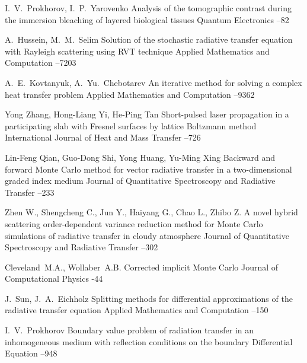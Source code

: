 \documentclass[12pt,reqno]{report}
\begin{document}
{\begin{thebibliography}{1}
\by I.~V.~Prokhorov, I.~P.~Yarovenko
\paper Analysis of the tomographic contrast during the immersion bleaching of layered biological tissues
\jour Quantum Electronics
--82

\by
A.~Hussein, M.~M.~Selim
\paper Solution of the stochastic radiative transfer equation with Rayleigh scattering using RVT technique \jour 
Applied Mathematics and Computation     --7203


\by A.~E.~Kovtanyuk, A.~Yu.~Chebotarev
\paper An iterative method for solving a complex heat transfer problem
\jour Applied Mathematics and Computation    --9362


 \by Yong Zhang, Hong-Liang Yi, He-Ping Tan  \paper Short-pulsed laser propagation in a participating slab with Fresnel
surfaces by lattice Boltzmann method \jour International Journal of Heat and Mass Transfer   --726


 \by Lin-Feng Qian, Guo-Dong Shi, Yong Huang, Yu-Ming Xing \paper Backward and forward Monte Carlo method for vector radiative transfer in a two-dimensional graded index medium \jour Journal of Quantitative Spectroscopy and Radiative Transfer   --233

 \by Zhen W., Shengcheng C., Jun Y., Haiyang G., Chao L., Zhibo Z.
\paper A novel hybrid scattering order-dependent variance
reduction method for Monte Carlo simulations of radiative transfer
in cloudy atmosphere \jour Journal of Quantitative Spectroscopy
and Radiative Transfer   --302


 \by  Cleveland~M.A., Wollaber~A.B. \paper 
Corrected implicit Monte Carlo 
\jour Journal of Computational Physics   -44



\by
J.~Sun,  J.~A.~Eichholz 
\paper Splitting methods for differential approximations of the radiative transfer equation  \jour 
Applied Mathematics and Computation    --150




 \by   I.~V.~Prokhorov \paper Boundary value problem of radiation transfer in an inhomogeneous medium with reflection conditions on the boundary
\jour Differential  Equation
--948




\end{thebibliography}}
\end{document}
